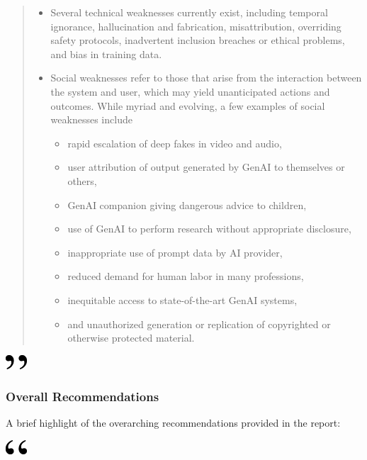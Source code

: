\documentclass[
]{book}
\begin{document}
\begin{quote}
\begin{itemize}
\item
  Several technical weaknesses currently exist, including temporal ignorance, hallucination and fabrication, misattribution, overriding safety protocols, inadvertent inclusion breaches or ethical problems, and bias in training data.
\item
  Social weaknesses refer to those that arise from the interaction between the system and user, which may yield unanticipated actions and outcomes. While myriad and evolving, a few examples of social weaknesses include

  \begin{itemize}
  \item
    rapid escalation of deep fakes in video and audio,
  \item
    user attribution of output generated by GenAI to themselves or others,
  \item
    GenAI companion giving dangerous advice to children,
  \item
    use of GenAI to perform research without appropriate disclosure,
  \item
    inappropriate use of prompt data by AI provider,
  \item
    reduced demand for human labor in many professions,
  \item
    inequitable access to state-of-the-art GenAI systems,
  \item
    and unauthorized generation or replication of copyrighted or otherwise protected material.
  \end{itemize}
\end{itemize}
\end{quote}

\includegraphics[width=0.3125in,height=0.20833in]{close.png}

\hypertarget{overall-recommendations}{%
\subsubsection*{Overall Recommendations}\label{overall-recommendations}}

A brief highlight of the overarching recommendations provided in the report:

\includegraphics[width=0.3125in,height=0.20833in]{open.png}
\end{document}
